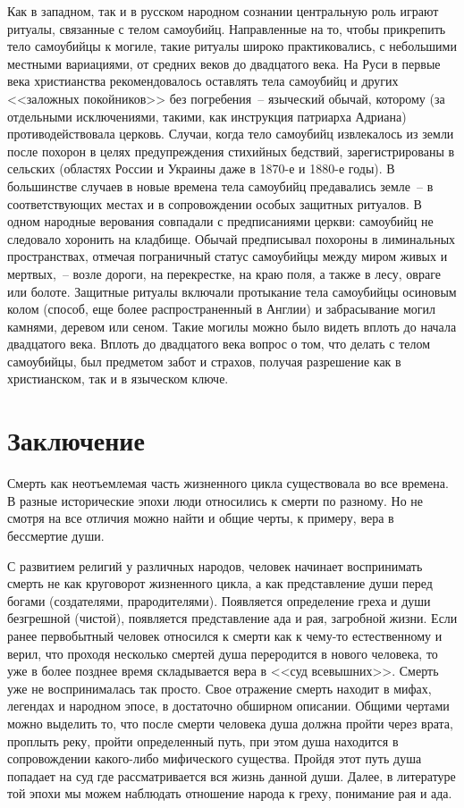 \documentclass[pscyr,titlepage]{hedreport}
\begin{document}
  Как в западном, так и в русском народном сознании центральную роль играют
  ритуалы, связанные с телом самоубийц. Направленные на то, чтобы прикрепить
  тело самоубийцы к могиле, такие ритуалы широко практиковались, с небольшими
  местными вариациями, от средних веков до двадцатого века. На Руси в первые
  века христианства рекомендовалось оставлять тела самоубийц и других <<заложных
  покойников>> без погребения~-- языческий обычай, которому (за отдельными
  исключениями, такими, как инструкция патриарха Адриана) противодействовала
  церковь. Случаи, когда тело самоубийц извлекалось из земли после похорон в
  целях предупреждения стихийных бедствий, зарегистрированы в сельских (областях
  России и Украины даже в 1870-е и 1880-е годы). В большинстве случаев в новые
  времена тела самоубийц предавались земле~-- в соответствующих местах и в
  сопровождении особых защитных ритуалов. В одном народные верования совпадали с
  предписаниями церкви: самоубийц не следовало хоронить на кладбище. Обычай
  предписывал похороны в лиминальных пространствах, отмечая пограничный статус
  самоубийцы между миром живых и мертвых,~-- возле дороги, на перекрестке, на
  краю поля, а также в лесу, овраге или болоте. Защитные ритуалы включали
  протыкание тела самоубийцы осиновым колом (способ, еще более распространенный
  в Англии) и забрасывание могил камнями, деревом или сеном. Такие могилы можно
  было видеть вплоть до начала двадцатого века. Вплоть до двадцатого века вопрос
  о том, что делать с телом самоубийцы, был предметом забот и страхов, получая
  разрешение как в христианском, так и в языческом ключе.

  \chapter*{Заключение}

  Смерть как неотъемлемая часть жизненного цикла существовала во все времена. В
  разные исторические эпохи люди относились к смерти по разному. Но не смотря на
  все отличия можно найти и общие черты, к примеру, вера в бессмертие души.

  С развитием религий у различных народов, человек начинает воспринимать смерть
  не как круговорот жизненного цикла, а как представление души перед богами
  (создателями, прародителями). Появляется определение греха и души безгрешной
  (чистой), появляется представление ада и рая, загробной жизни. Если ранее
  первобытный человек относился к смерти как к чему-то естественному и верил,
  что проходя несколько смертей душа переродится в нового человека, то уже в
  более позднее время складывается вера в <<суд всевышних>>. Смерть уже не
  воспринималась так просто. Свое отражение смерть находит в мифах, легендах и
  народном эпосе, в достаточно обширном описании. Общими чертами можно выделить
  то, что после смерти человека душа должна пройти через врата, проплыть реку,
  пройти определенный путь, при этом душа находится в сопровождении какого-либо
  мифического существа. Пройдя этот путь душа попадает на суд где
  рассматривается вся жизнь данной души. Далее, в литературе той эпохи мы можем
  наблюдать отношение народа к греху, понимание рая и ада.
\end{document}
